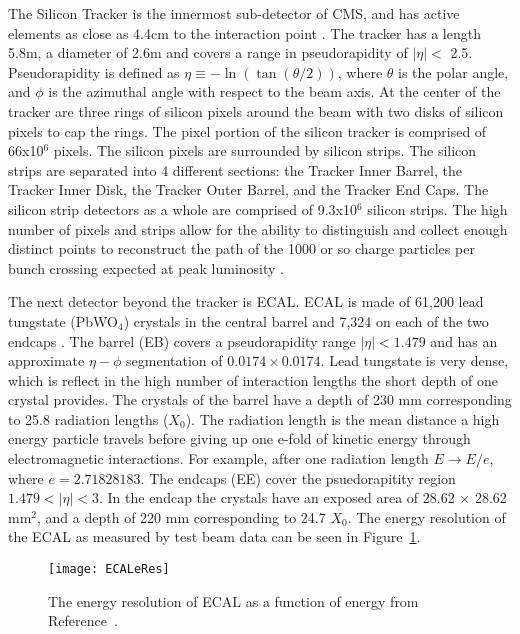 The Silicon Tracker is the innermost sub-detector of CMS, and has active
	elements as close as 4.4cm to the interaction point \cite{tCmsE}. 
The tracker has a length 5.8m, a diameter of 2.6m and
	covers a range in pseudorapidity of \(|\eta| <\) 2.5.
Pseudorapidity is defined as $\eta\equiv-\ln(\tan(\theta/2))$, where $\theta$ is 
	the polar angle, and $\phi$ is the azimuthal angle with respect to the 
	beam axis.
At the center of the tracker are three rings of silicon pixels around the beam 
	with two disks of silicon pixels to cap the rings.
The pixel portion of the silicon tracker is comprised of 66x10$^{6}$
	pixels.
The silicon pixels are surrounded by silicon strips.
The silicon strips are separated into 4 different sections: 
	the Tracker Inner Barrel, the Tracker Inner Disk, the Tracker Outer 
	Barrel, and the Tracker End Caps.
The silicon strip detectors as a whole are comprised of 9.3x10$^{6}$ silicon 
	strips.
The high number of pixels and strips allow for the ability to distinguish
	and collect enough distinct points to reconstruct the path of the 1000
	or so charge particles per bunch crossing expected at peak luminosity
	\cite{tCmsE}.  

The next detector beyond the tracker is ECAL.
ECAL is made of 61,200 lead tungstate (PbWO$_{4}$) crystals in the central
	barrel and 7,324 on each of the two endcaps \cite{tCmsE}.
The barrel (EB) covers a pseudorapidity range $|\eta| < 1.479$ and has an
	approximate $\eta-\phi$ segmentation of $0.0174\times0.0174$.
Lead tungstate is very dense, which is reflect in the high number of interaction
	lengths the short depth of one crystal provides.
The crystals of the barrel have a depth of 230 mm corresponding to 25.8 
	radiation lengths ($X_{0}$).
The radiation length is the mean distance a high energy particle travels before
	giving up one e-fold of kinetic energy through electromagnetic
	interactions.
For example, after one radiation length $E \rightarrow E/e$, where 
	$e = 2.71828183$. 
The endcaps (EE) cover the psuedorapitity region $1.479 < |\eta| < 3$.
In the endcap the crystals have an exposed area of 28.62 $\times$ 28.62 
	mm$^{2}$, and a depth of 220 mm corresponding to 24.7 $X_{0}$.
The energy resolution of the ECAL as measured by test beam data can be seen in
	Figure~\ref{ECALeRes}.
\begin{figure}[h]
  \centering
    \texttt{[image: ECALeRes]}
  \caption{The energy resolution of ECAL as a function of energy from 
	Reference~\cite{tCmsE}.}
  \label{ECALeRes}
\end{figure}

